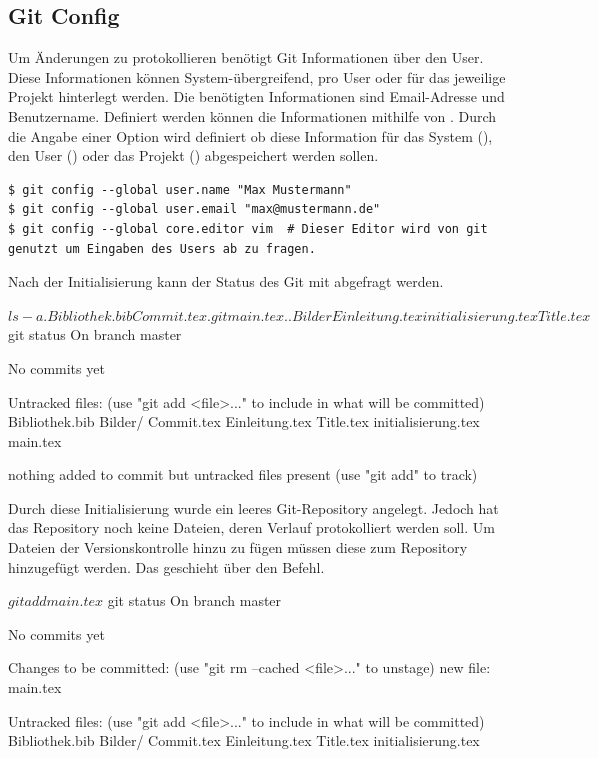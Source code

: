 \subsection{Git Config}
Um Änderungen zu protokollieren benötigt Git Informationen über den User. Diese Informationen können System-übergreifend, pro User oder für das jeweilige Projekt hinterlegt werden. Die benötigten Informationen sind Email-Adresse und Benutzername. Definiert werden können die Informationen mithilfe von . Durch die Angabe einer Option wird definiert ob diese Information für das System (), den User () oder das Projekt () abgespeichert werden sollen.
\begin{lstlisting}[breaklines=true]
$ git config --global user.name "Max Mustermann"
$ git config --global user.email "max@mustermann.de"
$ git config --global core.editor vim  # Dieser Editor wird von git genutzt um Eingaben des Users ab zu fragen.
\end{lstlisting}
Nach der Initialisierung kann der Status des Git mit  abgefragt werden.
\begin{mplisting}
$ ls -a
.   Bibliothek.bib  Commit.tex      .git                 main.tex
..  Bilder          Einleitung.tex  initialisierung.tex  Title.tex
$ git status
On branch master

No commits yet

Untracked files:
  (use "git add <file>..." to include in what will be committed)
	Bibliothek.bib
	Bilder/
	Commit.tex
	Einleitung.tex
	Title.tex
	initialisierung.tex
	main.tex

nothing added to commit but untracked files present (use "git add" to track)

\end{mplisting}
Durch diese Initialisierung wurde ein leeres Git-Repository angelegt. Jedoch hat das Repository noch keine Dateien, deren Verlauf protokolliert werden soll. Um Dateien der Versionskontrolle hinzu zu fügen müssen diese zum Repository hinzugefügt werden. Das geschieht über den  Befehl.
\begin{mplisting}
$ git add main.tex
$ git status
On branch master

No commits yet

Changes to be committed:
  (use "git rm --cached <file>..." to unstage)
	new file:   main.tex

Untracked files:
  (use "git add <file>..." to include in what will be committed)
	Bibliothek.bib
	Bilder/
	Commit.tex
	Einleitung.tex
	Title.tex
	initialisierung.tex
\end{mplisting}
